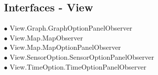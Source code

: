 \subsection*{Interfaces - View}
\hspace{0.0cm} $\bullet$ View.Graph.GraphOptionPanelObserver {\tiny {}} \\
\hspace{0.0cm} $\bullet$ View.Map.MapObserver {\tiny {}} \\
\hspace{0.0cm} $\bullet$ View.Map.MapOptionPanelObserver {\tiny {}} \\
\hspace{0.0cm} $\bullet$ View.SensorOption.SensorOptionPanelObserver {\tiny {}} \\
\hspace{0.0cm} $\bullet$ View.TimeOption.TimeOptionPanelObserver {\tiny {}} \\
